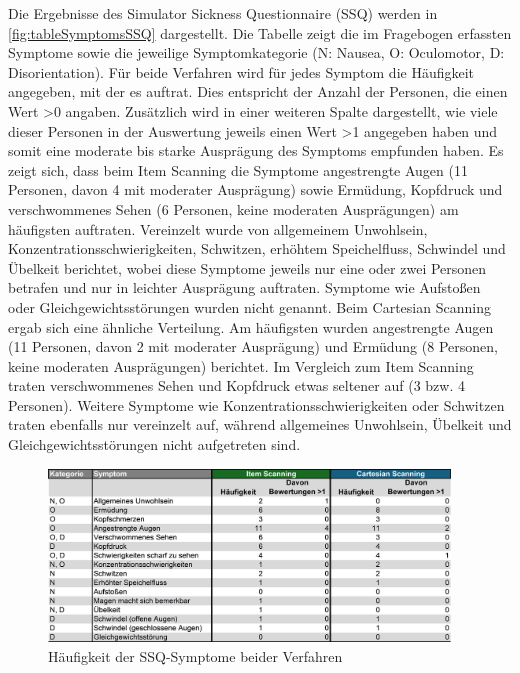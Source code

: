 Die Ergebnisse des Simulator Sickness Questionnaire (SSQ) werden in \autoref{fig:tableSymptomsSSQ} dargestellt. Die Tabelle zeigt die im Fragebogen erfassten Symptome sowie die jeweilige Symptomkategorie (N: Nausea, O: Oculomotor, D: Disorientation). Für beide Verfahren wird für jedes Symptom die Häufigkeit angegeben, mit der es auftrat. Dies entspricht der Anzahl der Personen, die einen Wert >0 angaben. Zusätzlich wird in einer weiteren Spalte dargestellt, wie viele dieser Personen in der Auswertung jeweils einen Wert >1 angegeben haben und somit eine moderate bis starke Ausprägung des Symptoms empfunden haben. 
Es zeigt sich, dass beim Item Scanning die Symptome angestrengte Augen (11 Personen, davon 4 mit moderater Ausprägung) sowie Ermüdung, Kopfdruck und verschwommenes Sehen (6 Personen, keine moderaten Ausprägungen) am häufigsten auftraten. Vereinzelt wurde von allgemeinem Unwohlsein, Konzentrationsschwierigkeiten, Schwitzen, erhöhtem Speichelfluss, Schwindel und Übelkeit berichtet, wobei diese Symptome jeweils nur eine oder zwei Personen betrafen und nur in leichter Ausprägung auftraten. Symptome wie Aufstoßen oder Gleichgewichtsstörungen wurden nicht genannt.
Beim Cartesian Scanning ergab sich eine ähnliche Verteilung. Am häufigsten wurden angestrengte Augen (11 Personen, davon 2 mit moderater Ausprägung) und Ermüdung (8 Personen, keine moderaten Ausprägungen) berichtet. Im Vergleich zum Item Scanning traten verschwommenes Sehen und Kopfdruck etwas seltener auf (3 bzw. 4 Personen). Weitere Symptome wie Konzentrationsschwierigkeiten oder Schwitzen traten ebenfalls nur vereinzelt auf, während allgemeines Unwohlsein, Übelkeit und Gleichgewichtsstörungen nicht aufgetreten sind.

\begin{figure}[tbh]
    \centering
   \includegraphics[width=0.95\textwidth]{images/Results/SSQ-Table-2.png}
    \caption{Häufigkeit der SSQ-Symptome beider Verfahren }
    \label{fig:tableSymptomsSSQ}
   \end{figure}

